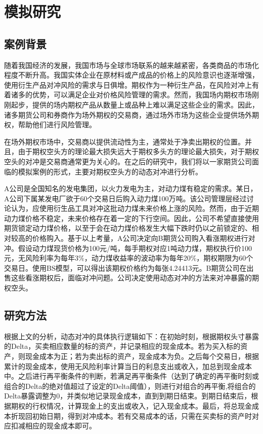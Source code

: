 
\chapter{模拟研究}
\label{chap:analysis}

\section{案例背景}

随着我国经济的发展，我国市场与全球市场联系的越来越紧密，各类商品的市场化程度不断升高。我国实体企业在原材料或产成品的价格上的风险意识也逐渐增强，使用衍生产品对冲风险的需求与日俱增。期权作为一种衍生产品，在风险对冲上有着诸多的优势，可以满足企业对价格风险管理的需求。然而，我国场内期权市场刚刚起步，提供的场内期权产品从数量上或品种上难以满足这些企业的需求。因此，诸多期货公司和券商作为场外期权的交易商，通过场外市场为这些企业提供场外期权，帮助他们进行风险管理。

在场外期权市场中，交易商以提供流动性为主，通常处于净卖出期权的位置。并且，由于期权空头方的理论最大损失远大于期权多头方的理论最大损失，对于期权空头的对冲是交易商通常更为关心的。在之后的研究中，我们将以一家期货公司面临的模拟案例的形式，主要对期权空头方的动态对冲进行分析。

A公司是全国知名的发电集团，以火力发电为主，对动力煤有稳定的需求。某日，A公司下属某发电厂欲于60个交易日后购入动力煤100万吨。该公司管理层经过讨论认为，应使用衍生品工具对冲这批动力煤未来价格上涨的风险。然而，由于近期动力煤价格不稳定，未来价格存在着一定的下行空间。因此，公司不希望直接使用期货锁定动力煤价格，以至于会在动力煤价格发生大幅下跌时仍以之前锁定的、相对较高的价格购入。基于以上考量，A公司决定向B期货公司购入看涨期权进行对冲。假设动力煤现货价格为100元/吨，每手期权对应1吨动力煤，期权执行价100元，无风险利率为每年3\%，动力煤收益率的波动率为每年20\%，期权期限为60个交易日。使用BS模型，可以得出该期权价格约为每张4.24413元。B期货公司在出售这些看涨期权后，面临对冲问题。公司决定使用动态对冲的方法来对冲暴露的期权空头。

\section{研究方法}

根据上文的分析，动态对冲的具体执行逻辑如下：在初始时刻，根据期权头寸暴露的Delta，买卖相应数量的标的资产，并记录相应的现金成本。若为买入标的资产，则现金成本为正；若为卖出标的资产，现金成本为负。之后每个交易日，根据累计的现金成本，使用无风险利率计算当日的利息支出或收入，加总到现金成本中。之后进行再平衡条件的判断，若满足再平衡条件（达到了确定的再平衡时刻或组合的Delta的绝对值超过了设定的Delta阈值），则进行对组合的再平衡,将组合的Delta暴露调整为0，并类似地记录现金成本，直到到期日结束。到期日结束后，根据期权的行权情况，计算现金上的支出或收入，记入现金成本。最后，将总现金成本折现回初始日期，得到对冲成本。若有交易成本的话，只需在买卖标的资产时对应扣减相应的现金成本即可。

